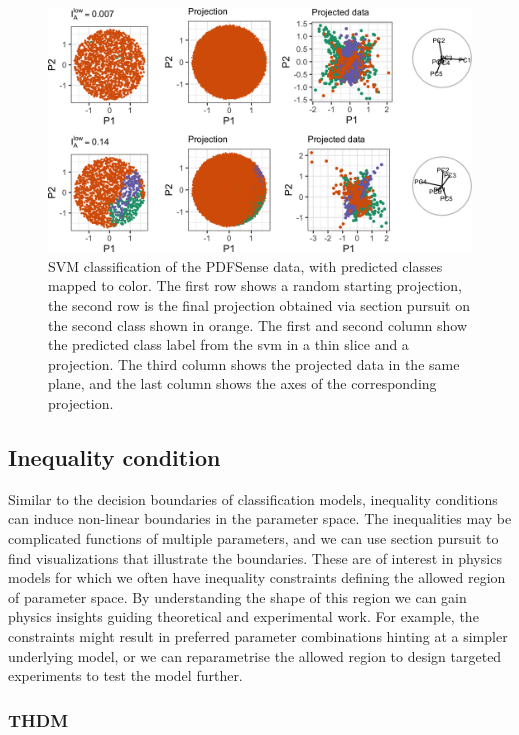 \documentclass[]{interact}
\theoremstyle{plain}%
\theoremstyle{definition}
\theoremstyle{remark}
\begin{document}
\begin{figure}
\includegraphics[width=1\linewidth]{section_pursuit_files/figure-latex/pdffit-1} \caption{SVM classification of the PDFSense data, with predicted classes mapped to color. The first row shows a random starting projection, the second row is the final projection obtained via section pursuit on the second class shown in orange. The first and second column show the predicted class label from the svm in a thin slice and a projection. The third column shows the projected data in the same plane, and the last column shows the axes of the corresponding projection.}\label{fig:pdffit}
\end{figure}

\hypertarget{inequality-condition}{%
\subsection{Inequality condition}\label{inequality-condition}}

Similar to the decision boundaries of classification models, inequality
conditions can induce non-linear boundaries in the parameter space. The
inequalities may be complicated functions of multiple parameters, and we
can use section pursuit to find visualizations that illustrate the
boundaries. These are of interest in physics models for which we often
have inequality constraints defining the allowed region of parameter
space. By understanding the shape of this region we can gain physics
insights guiding theoretical and experimental work. For example, the
constraints might result in preferred parameter combinations hinting at
a simpler underlying model, or we can reparametrise the allowed region
to design targeted experiments to test the model further.

\hypertarget{thdm}{%
\subsubsection{THDM}\label{thdm}}
\end{document}
